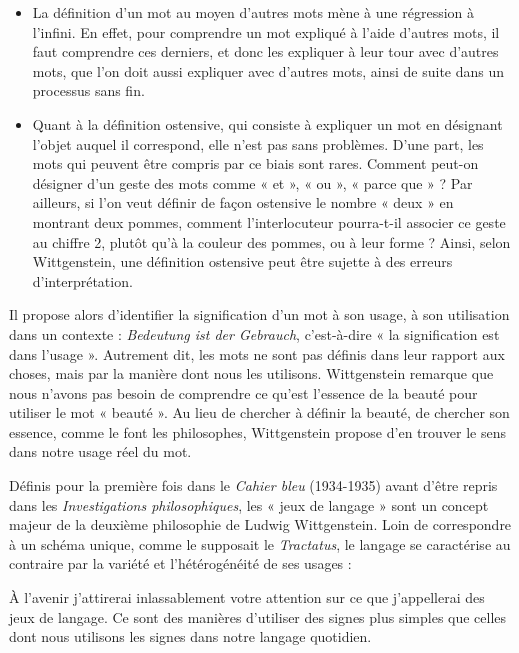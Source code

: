 \begin{itemize}
\item La définition d’un mot au moyen d’autres mots mène à une régression à l’infini. En effet, pour comprendre un mot expliqué à l’aide d’autres mots, il faut comprendre ces derniers, et donc les expliquer à leur tour avec d’autres mots, que l’on doit aussi expliquer avec d’autres mots, ainsi de suite dans un processus sans fin.
\item Quant à la définition ostensive, qui consiste à expliquer un mot en désignant l’objet auquel il correspond, elle n’est pas sans problèmes. D’une part, les mots qui peuvent être compris par ce biais sont rares. Comment peut-on désigner d’un geste des mots comme « et », « ou », « parce que » ? Par ailleurs, si l’on veut définir de façon ostensive le nombre « deux » en montrant deux pommes, comment l’interlocuteur pourra-t-il associer ce geste au chiffre 2, plutôt qu’à la couleur des pommes, ou à leur forme ? Ainsi, selon Wittgenstein, une définition ostensive peut être sujette à des erreurs d’interprétation.
\end{itemize}
Il propose alors d’identifier la signification d’un mot à son usage, à son utilisation dans un contexte : \textit{Bedeutung ist der Gebrauch}, c’est-à-dire « la signification est dans l’usage ». Autrement dit, les mots ne sont pas définis dans leur rapport aux choses, mais par la manière dont nous les utilisons. Wittgenstein remarque que nous n’avons pas besoin de comprendre ce qu’est l’essence de la beauté pour utiliser le mot « beauté ». Au lieu de chercher à définir la beauté, de chercher son essence, comme le font les philosophes, Wittgenstein propose d’en trouver le sens dans notre usage réel du mot.

Définis pour la première fois dans le \textit{Cahier bleu} (1934-1935) avant d’être repris dans les \textit{Investigations philosophiques}, les « jeux de langage » sont un concept majeur de la deuxième philosophie de Ludwig Wittgenstein. Loin de correspondre à un schéma unique, comme le supposait le \textit{Tractatus}, le langage se caractérise au contraire par la variété et l’hétérogénéité de ses usages :

\begin{lecture}{}
À l’avenir j’attirerai inlassablement votre attention sur ce que j’appellerai des jeux de langage. Ce sont des manières d’utiliser des signes plus simples que celles dont nous utilisons les signes dans notre langage quotidien.
\end{lecture}


